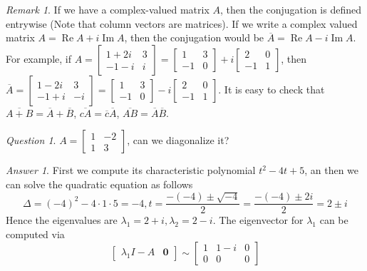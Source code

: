 \documentclass{beamer}
\theoremstyle{definition}
\theoremstyle{remark}
\newtheorem*{remark}{Remark}
\newtheorem*{question}{Question}
\newtheorem*{answer}{Answer}
\begin{document}
\begin{frame}[t]
\begin{remark}
If we have a complex-valued matrix $A$, then the conjugation is defined entrywise (Note that column vectors are matrices). If we write a complex valued matrix $A=\operatorname{Re}A+i\operatorname{Im}A$\pause, then the conjugation would be $\overline A=\operatorname{Re}A-i\operatorname{Im}A$\pause. For example, if $A=\begin{bmatrix}
1+2i&3\\
-1-i&i
\end{bmatrix}=\begin{bmatrix}
1&3\\
-1&0
\end{bmatrix}+i\begin{bmatrix}
2&0\\
-1&1
\end{bmatrix}$\pause, then $\overline A=\begin{bmatrix}
1-2i&3\\
-1+i&-i
\end{bmatrix}=\begin{bmatrix}
1&3\\
-1&0
\end{bmatrix}-i\begin{bmatrix}
2&0\\
-1&1
\end{bmatrix}$\pause. It is easy to check that $\overline{A+B}=\overline A+\overline B$, $\overline{cA}=\overline c\overline A$, $\overline{AB}=\overline A\overline B$.
\end{remark}
\end{frame}

\begin{frame}[t]
\begin{question}
$A=\begin{bmatrix}
1&-2\\1&3
\end{bmatrix}$, can we diagonalize it?
\end{question}
\pause
\begin{answer}
First we compute its characteristic polynomial $t^2-4t+5$, an then we can solve the quadratic equation as follows
\[
\Delta=(-4)^2-4\cdot1\cdot5=-4,t=\frac{-(-4)\pm\sqrt{-4}}{2}=\frac{-(-4)\pm2i}{2}=2\pm i
\]
Hence the eigenvalues are $\lambda_1=2+i,\lambda_2=2-i$\pause. The eigenvector for $\lambda_1$ can be computed via
\[
\left[\begin{array}{c|c}
\lambda_1I-A&\mathbf0
\end{array}\right]\sim\left[\begin{array}{cc|c}
1&1-i&0\\
0&0&0
\end{array}\right]
\]
\end{answer}
\end{frame}
\end{document}
